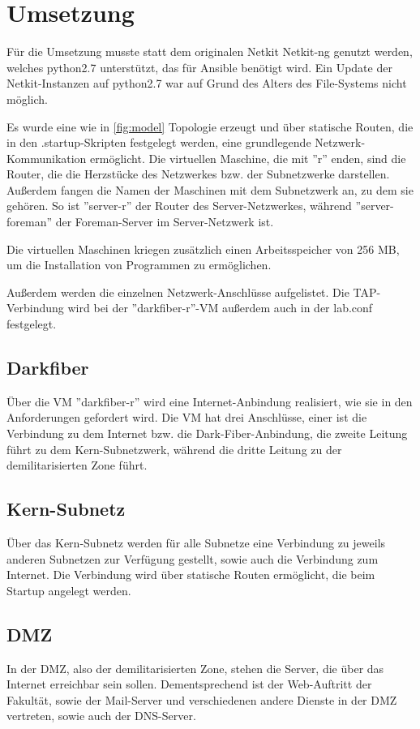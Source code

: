 \chapter{Umsetzung}

Für die Umsetzung musste statt dem originalen Netkit Netkit-ng genutzt werden, welches python2.7 unterstützt, das für Ansible benötigt wird. Ein Update der Netkit-Instanzen auf python2.7 war auf Grund des Alters des File-Systems nicht möglich.

Es wurde eine wie in \ref{fig:model} Topologie erzeugt und über statische Routen, die in den .startup-Skripten festgelegt werden, eine grundlegende Netzwerk-Kommunikation ermöglicht. 
Die virtuellen Maschine, die mit ''r'' enden, sind die Router, die die Herzstücke des Netzwerkes bzw. der Subnetzwerke darstellen. 
Außerdem fangen die Namen der Maschinen mit dem Subnetzwerk an, zu dem sie gehören. 
So ist ''server-r'' der Router des Server-Netzwerkes, während ''server-foreman'' der Foreman-Server im Server-Netzwerk ist.

Die virtuellen Maschinen kriegen zusätzlich einen Arbeitsspeicher von 256 MB, um die Installation von Programmen zu ermöglichen.

Außerdem werden die einzelnen Netzwerk-Anschlüsse aufgelistet. Die TAP-Verbindung wird bei der ''darkfiber-r''-VM außerdem auch in der lab.conf festgelegt.

\section{Darkfiber}
Über die VM ''darkfiber-r'' wird eine Internet-Anbindung realisiert, wie sie in den Anforderungen gefordert wird. Die VM hat drei Anschlüsse, einer ist die Verbindung zu dem Internet bzw. die Dark-Fiber-Anbindung, die zweite Leitung führt zu dem Kern-Subnetzwerk, während die dritte Leitung zu der demilitarisierten Zone führt.

\section{Kern-Subnetz}
Über das Kern-Subnetz werden für alle Subnetze eine Verbindung zu jeweils anderen Subnetzen zur Verfügung gestellt, sowie auch die Verbindung zum Internet. Die Verbindung wird über statische Routen ermöglicht, die beim Startup angelegt werden.

\section{DMZ}
In der DMZ, also der demilitarisierten Zone, stehen die Server, die über das Internet erreichbar sein sollen. Dementsprechend ist der Web-Auftritt der Fakultät, sowie der Mail-Server und verschiedenen andere Dienste in der DMZ vertreten, sowie auch der DNS-Server.

